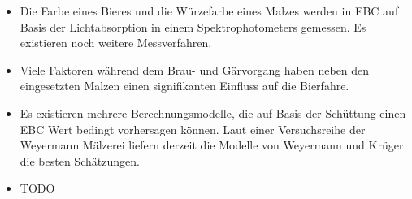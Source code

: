 \documentclass[a4paper,parskip=half]{scrartcl}
\begin{document}
\begin{itemize}
\item Die Farbe eines Bieres und die Würzefarbe eines Malzes werden in EBC auf Basis der Lichtabsorption in einem Spektrophotometers gemessen. Es existieren noch weitere Messverfahren.
\item Viele Faktoren während dem Brau- und Gärvorgang haben neben den eingesetzten Malzen einen signifikanten Einfluss auf die Bierfahre.
\item Es existieren mehrere Berechnungsmodelle, die auf Basis der Schüttung einen EBC Wert bedingt vorhersagen können. Laut einer Versuchsreihe der Weyermann Mälzerei liefern derzeit die Modelle von Weyermann und Krüger die besten Schätzungen.
\item TODO
\end{itemize}

\printbibliography[title=Quellen]
\end{document}
